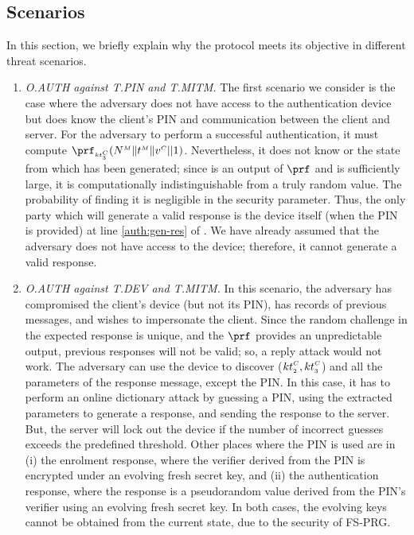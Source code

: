 \subsection{Scenarios}
In this section, we briefly explain why the protocol meets its objective in different threat scenarios. 

\begin{enumerate}

\item\textit{O.AUTH against 
T.PIN and T.MITM.}  The first scenario we consider is the case where the adversary does not have
access to the authentication device but does know the client's PIN and communication between the client and server.  For the adversary to perform a successful authentication, it must compute $\prf_{\sss\VC{\keyt_{\sss 3}}}(\VM{\nonce} \|  \VM{\trans} \| \VC{\verifier}|| 1)$. Nevertheless, it does not know  or the state from which  has been generated; since   is an output of $\prf$ and is sufficiently large, it is computationally indistinguishable from a truly random value.  The probability of finding it is negligible in the security parameter.  Thus, the only party which will generate a valid response is the device itself (when the PIN is provided) at line \ref{auth:gen-res} of .  We have already assumed that the adversary does not have access to the device; therefore, it cannot generate a valid response.

\item\textit{O.AUTH against T.DEV and T.MITM.}\label{O.AUTH:T.DEV-plus-T.MITM}
In this scenario, the adversary has compromised the client's device (but not its PIN), has records of previous messages, and wishes to impersonate the client.
%
Since the random challenge in the expected response is unique, and the $\prf$ provides an unpredictable output, previous responses will not be valid; so, a reply attack would not work. The adversary can use the device to discover (${kt}_{\scriptscriptstyle 2}^{\scriptscriptstyle C}, {kt}_{\scriptscriptstyle 3}^{\scriptscriptstyle C}$) and all the parameters of the response message, except the PIN. In this case, it has to perform an online dictionary attack by guessing a PIN, using the extracted parameters to generate a response, and sending the response to the server. But, the server will lock out the device if the number of incorrect guesses exceeds the predefined threshold. Other places where the PIN is used are in (i) the enrolment response, where the verifier derived from the PIN is encrypted under an evolving fresh secret key, and (ii) the authentication response, where the response is a pseudorandom value derived from the PIN's verifier using an evolving fresh secret key. In both cases, the evolving keys cannot be obtained from the current state, due to the security of FS-PRG. 




\end{enumerate}
